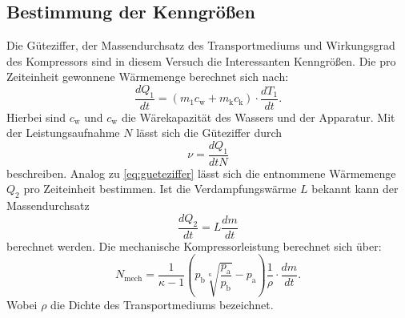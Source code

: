 \subsection{Bestimmung der Kenngrößen}
\label{sec:BdK}
Die Güteziffer, der Massendurchsatz des Transportmediums und Wirkungsgrad des Kompressors sind in diesem Versuch die Interessanten Kenngrößen.
Die pro Zeiteinheit gewonnene Wärmemenge berechnet sich nach:
\begin{equation}
	\frac{dQ_1}{dt}=(m_1c_{\text{w}}+m_{\text{k}}c_{\text{k}})\cdot \frac{dT_1}{dt} .
	\label{eq:gueteziffer}
\end{equation}
Hierbei sind $c_{\text{w}}$ und $c_{\text{w}}$ die Wärekapazität des Wassers und der Apparatur.
Mit der Leistungsaufnahme $N$ lässt sich die Güteziffer durch
\begin{equation}
	\nu=\frac{dQ_1}{dt N}
\end{equation}
beschreiben.
Analog zu \eqref{eq:gueteziffer} lässt sich die entnommene Wärmemenge $Q_2$ pro Zeiteinheit bestimmen.
Ist die Verdampfungswärme $L$ bekannt kann der Massendurchsatz
\begin{equation}
	\frac{dQ_2}{dt}=L\frac{dm}{dt}
	\label{eq:massendurchsatz}
\end{equation}
berechnet werden.
Die mechanische Kompressorleistung berechnet sich über:
\begin{equation}
	N_{\text{mech}} = \frac{1}{\kappa - 1} \left( p_{\text{b}} \sqrt[\kappa]{\frac{p_{\text{a}}}{p_{\text{b}}}} -p_{\text{a}} \right) \frac{1}{\rho} \cdot \frac{dm}{dt} .
	\label{eq:arbeit}
\end{equation}
Wobei $\rho$ die Dichte des Transportmediums bezeichnet.
